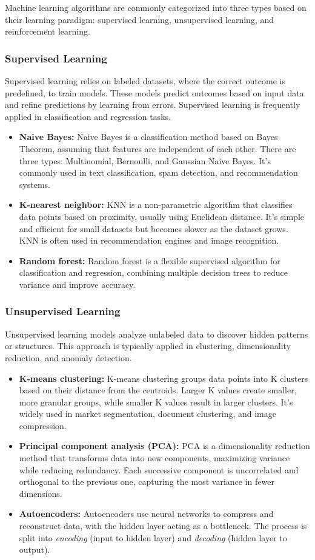 \documentclass[12pt,oneside,openright,a4paper]{cpe-english-project}
\begin{document}
Machine learning algorithms are commonly categorized into three types based on their learning paradigm: supervised learning, unsupervised learning, and reinforcement learning.

\subsubsection{Supervised Learning}
Supervised learning relies on labeled datasets, where the correct outcome is predefined, to train models. These models predict outcomes based on input data and refine predictions by learning from errors. Supervised learning is frequently applied in classification and regression tasks.
\begin{itemize}
\item  \textbf{Naive Bayes:} Naive Bayes is a classification method based on Bayes Theorem, assuming that features are independent of each other. There are three types: Multinomial, Bernoulli, and Gaussian Naive Bayes. It's commonly used in text classification, spam detection, and recommendation systems.
\item  \textbf{K-nearest neighbor:} KNN is a non-parametric algorithm that classifies data points based on proximity, usually using Euclidean distance. It’s simple and efficient for small datasets but becomes slower as the dataset grows. KNN is often used in recommendation engines and image recognition.
\item  \textbf{Random forest:} Random forest is a flexible supervised algorithm for classification and regression, combining multiple decision trees to reduce variance and improve accuracy.
\end{itemize}

\subsubsection{Unsupervised Learning}
Unsupervised learning models analyze unlabeled data to discover hidden patterns or structures. This approach is typically applied in clustering, dimensionality reduction, and anomaly detection.
\begin{itemize}
\item  \textbf{K-means clustering:} K-means clustering groups data points into K clusters based on their distance from the centroids. Larger K values create smaller, more granular groups, while smaller K values result in larger clusters. It's widely used in market segmentation, document clustering, and image compression.
\item  \textbf{Principal component analysis (PCA):} PCA is a dimensionality reduction method that transforms data into new components, maximizing variance while reducing redundancy. Each successive component is uncorrelated and orthogonal to the previous one, capturing the most variance in fewer dimensions.
\item  \textbf{Autoencoders:} Autoencoders use neural networks to compress and reconstruct data, with the hidden layer acting as a bottleneck. The process is split into \emph{encoding} (input to hidden layer) and \emph{decoding} (hidden layer to output).
\end{itemize}
\end{document}
